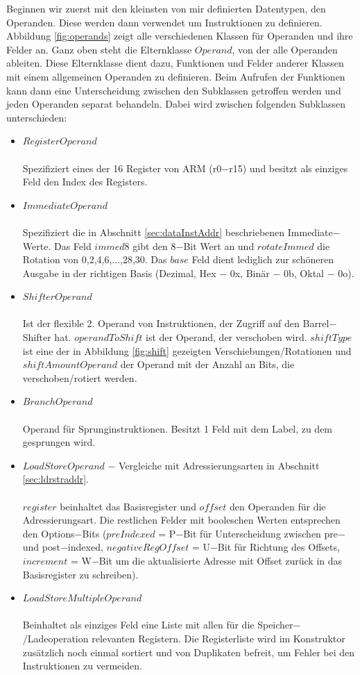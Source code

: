 \documentclass[a4paper, 11pt, onecolumn]{article}
\begin{document}
Beginnen wir zuerst mit den kleinsten von mir definierten Datentypen, den Operanden. Diese werden dann verwendet um Instruktionen zu definieren. Abbildung \ref{fig:operands} zeigt alle verschiedenen Klassen für Operanden und ihre Felder an. Ganz oben steht die Elternklasse $Operand$, von der alle Operanden ableiten. Diese Elternklasse dient dazu, Funktionen und Felder anderer Klassen mit einem allgemeinen Operanden zu definieren. Beim Aufrufen der Funktionen kann dann eine Unterscheidung zwischen den Subklassen getroffen werden und jeden Operanden separat behandeln. Dabei wird zwischen folgenden Subklassen unterschieden:

\begin{itemize}
\item $RegisterOperand$\\ \\Spezifiziert eines der 16 Register von ARM (r0$-$r15) und besitzt als einziges Feld den Index des Registers.
\item $ImmediateOperand$\\ \\Spezifiziert die in Abschnitt \ref{sec:dataInstAddr} beschriebenen Immediate$-$Werte. Das Feld $immed8$ gibt den 8$-$Bit Wert an und $rotateImmed$ die Rotation von 0,2,4,6,...,28,30. Das $base$ Feld dient lediglich zur schöneren Ausgabe in der richtigen Basis (Dezimal, Hex $-$ 0x, Binär $-$ 0b, Oktal $-$ 0o).
\newpage
\item $ShifterOperand$\\ \\Ist der flexible 2. Operand von Instruktionen, der Zugriff auf den Barrel$-$Shifter hat. $operandToShift$ ist der Operand, der verschoben wird. $shiftType$ ist eine der in Abbildung \ref{fig:shift} gezeigten Verschiebungen/Rotationen und $shiftAmountOperand$ der Operand mit der Anzahl an Bits, die verschoben/rotiert werden.
\item $BranchOperand$\\ \\Operand für Sprunginstruktionen. Besitzt 1 Feld mit dem Label, zu dem gesprungen wird.
\item $LoadStoreOperand$ $-$ Vergleiche mit Adressierungsarten in Abschnitt \ref{sec:ldrstraddr}.\\ \\$register$ beinhaltet das Basisregister und $offset$ den Operanden für die Adressierungsart. Die restlichen Felder mit booleschen Werten entsprechen den Options$-$Bits ($preIndexed$ = P$-$Bit für Unterscheidung zwischen pre$-$ und post$-$indexed, $negativeRegOffset$ = U$-$Bit für Richtung des Offsets, $increment$ = W$-$Bit um die aktualisierte Adresse mit Offset zurück in das Basisregister zu schreiben).
\item $LoadStoreMultipleOperand$\\ \\
Beinhaltet als einziges Feld eine Liste mit allen für die Speicher$-$/Ladeoperation relevanten Registern. Die Registerliste wird im Konstruktor zusätzlich noch einmal sortiert und von Duplikaten befreit, um Fehler bei den Instruktionen zu vermeiden.
\end{itemize}
\end{document}

